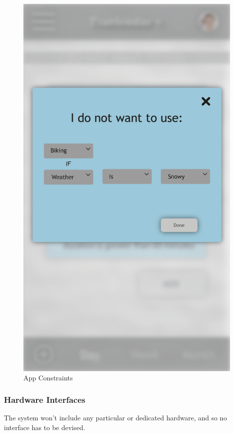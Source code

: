 \begin{figure}[!h]
\begin{minipage}{.275\textwidth}
		\includegraphics[width=\linewidth]{Images/Mockups/MockupConstraintsApp3.png}
	\end{minipage}
	\caption{App Constraints}
\end{figure}

\subsubsection{Hardware Interfaces}

The system won't include any particular or dedicated hardware, and so no interface has to be devised.


